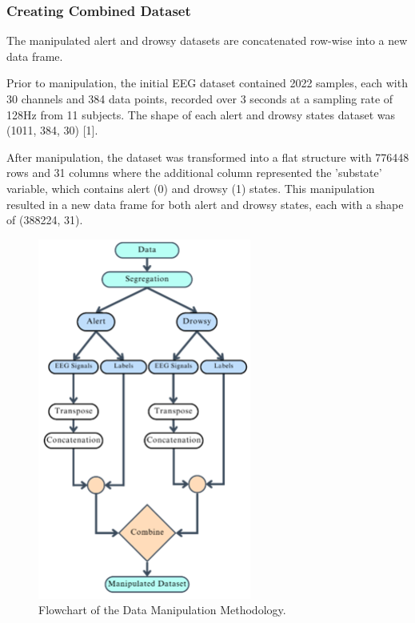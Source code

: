 \documentclass{IEEE_lsens}
\begin{document}
\subsubsection{Creating Combined Dataset} The manipulated alert and drowsy datasets are concatenated row-wise into a new data frame.

Prior to manipulation, the initial EEG dataset contained 2022 samples, each with 30 channels and 384 data points, recorded over 3 seconds at a sampling rate of 128Hz from 11 subjects. The shape of each alert and drowsy states dataset was (1011, 384, 30) [1]. 

After manipulation, the dataset was transformed into a flat structure with 776448 rows and 31 columns where the additional column represented the 'substate' variable, which contains alert (0) and drowsy (1) states. This manipulation resulted in a new data frame for both alert and drowsy states, each with a shape of (388224, 31).
\begin{figure}[t!]
\centering
\includegraphics[width=7cm,keepaspectratio=true]{Fig_data_manipulation.png}
\vspace{-0.2cm}
\caption{\scriptsize Flowchart of the Data Manipulation Methodology.
\label{Fig_data_manipulation}}
\vspace{-0.3cm}
\end{figure}
\end{document}
